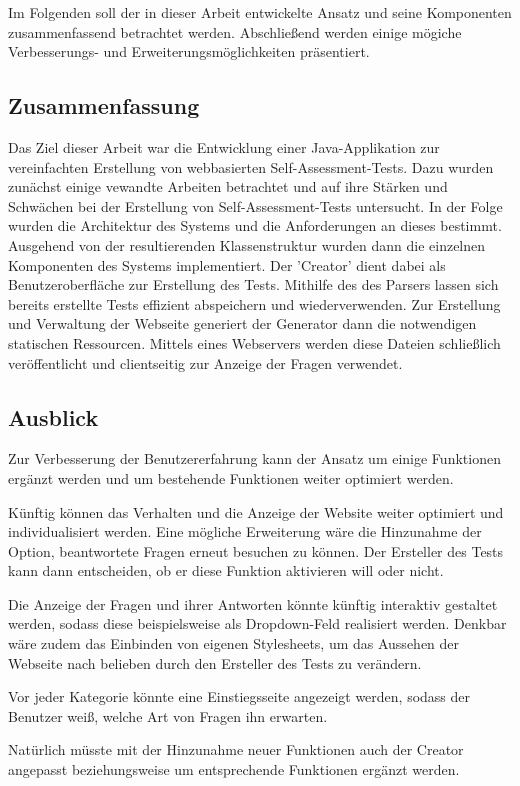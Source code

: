 \label{Zusammenfassung_Ausblick} 

Im Folgenden soll der in dieser Arbeit entwickelte Ansatz und seine Komponenten zusammenfassend betrachtet werden. Abschließend werden einige mögiche Verbesserungs- und Erweiterungsmöglichkeiten präsentiert.

\subsection{Zusammenfassung}

Das Ziel dieser Arbeit war die Entwicklung einer Java-Applikation zur vereinfachten Erstellung von webbasierten Self-Assessment-Tests. Dazu wurden zunächst einige vewandte Arbeiten betrachtet und auf ihre Stärken und Schwächen bei der Erstellung von Self-Assessment-Tests untersucht. In der Folge wurden die Architektur des Systems und die Anforderungen an dieses bestimmt. Ausgehend von der resultierenden Klassenstruktur wurden dann die einzelnen Komponenten des Systems implementiert. Der 'Creator' dient dabei als Benutzeroberfläche zur Erstellung des Tests. Mithilfe des des Parsers lassen sich bereits erstellte Tests effizient abspeichern und wiederverwenden. Zur Erstellung und Verwaltung der Webseite generiert der Generator dann die notwendigen statischen Ressourcen. Mittels eines Webservers werden diese Dateien schließlich veröffentlicht und clientseitig zur Anzeige der Fragen verwendet.

\subsection{Ausblick}

Zur Verbesserung der Benutzererfahrung kann der Ansatz um einige Funktionen ergänzt werden und um bestehende Funktionen weiter optimiert werden. 

Künftig können das Verhalten und die Anzeige der Website weiter optimiert und individualisiert werden.  
Eine mögliche Erweiterung wäre die Hinzunahme der Option, beantwortete Fragen erneut besuchen zu können. Der Ersteller des Tests kann dann entscheiden, ob er diese Funktion aktivieren will oder nicht.

Die Anzeige der Fragen und ihrer Antworten könnte künftig interaktiv gestaltet werden, sodass diese beispielsweise als Dropdown-Feld realisiert werden. Denkbar wäre zudem das Einbinden von eigenen Stylesheets, um das Aussehen der Webseite nach belieben durch den Ersteller des Tests zu verändern.

Vor jeder Kategorie könnte eine Einstiegsseite angezeigt werden, sodass der Benutzer weiß, welche Art von Fragen ihn erwarten. 

Natürlich müsste mit der Hinzunahme neuer Funktionen auch der Creator angepasst beziehungsweise um entsprechende Funktionen ergänzt werden.